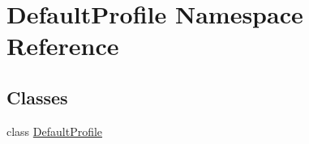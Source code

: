 \hypertarget{namespace_default_profile}{\section{Default\-Profile Namespace Reference}
\label{namespace_default_profile}
}
\subsection*{Classes}
\begin{DoxyCompactItemize}
\item 
class \hyperlink{class_default_profile_1_1_default_profile}{Default\-Profile}
\end{DoxyCompactItemize}
